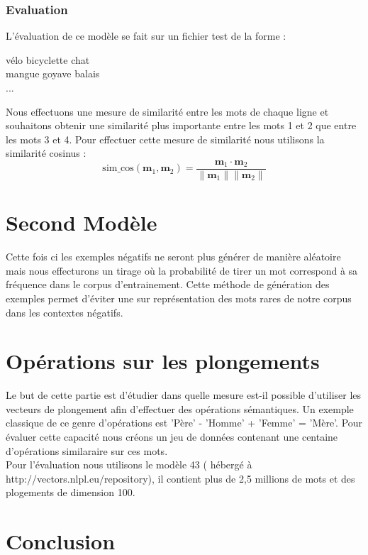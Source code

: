 \documentclass[12pt]{article}
\begin{document}
\subsubsection{Evaluation}
L'évaluation de ce modèle se fait sur un fichier test de la forme :
\begin{center}
vélo bicyclette chat\\
mangue goyave balais\\
...\\
\end{center}
Nous effectuons une mesure de similarité entre les mots de chaque ligne et souhaitons obtenir
une similarité plus importante entre les mots 1 et 2 que entre les mots 3 et 4. Pour effectuer cette mesure de 
similarité nous utilisons la similarité cosinus :
\[
\text{sim\_cos}(\mathbf{m}_1, \mathbf{m}_2) = \frac{\mathbf{m}_1 \cdot \mathbf{m}_2}{\|\mathbf{m}_1\| \|\mathbf{m}_2\|}
\]



\section{Second Modèle}

Cette fois ci les exemples négatifs ne seront plus générer de manière aléatoire mais nous effecturons 
un tirage où la probabilité de tirer un mot correspond à sa fréquence dans le corpus d'entrainement.
Cette méthode de génération des exemples permet d'éviter une sur représentation des mots rares de notre 
corpus dans les contextes négatifs.

\section{Opérations sur les plongements} 

Le but de cette partie est d'étudier dans quelle mesure est-il possible d'utiliser les vecteurs
de plongement afin d'effectuer des opérations sémantiques. Un exemple classique de ce genre d'opérations est
'Père' - 'Homme' + 'Femme' = 'Mère'. Pour évaluer cette capacité nous créons un jeu de données contenant une 
centaine d'opérations similaraire sur ces mots. \\
Pour l'évaluation nous utilisons le modèle 43 ( hébergé à http://vectors.nlpl.eu/repository), il contient 
plus de 2,5 millions de mots et des plogements de dimension 100.  


\section{Conclusion}
\end{document}
